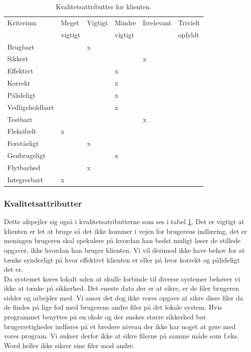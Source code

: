 \documentclass[10pt,a4paper,danish]{article}
\begin{document}
\begin{table}[h!]
  \begin{center}
    \begin{tabular}{llllll}
      \toprule
      Kriterium & Meget   & Vigtigt & Mindre  & Irrelevant & Trivielt \\
                & vigtigt &         & vigtigt &            & opfyldt  \\
      \midrule
      Brugbart        & &x& & & \\
      Sikkert         & & & &x& \\
      Effektivt       & & &x& & \\
      Korrekt         & & &x& & \\
      Pålideligt      & & &x& & \\
      Vedligeholdbart & & &x& & \\
      Testbart        & & & &x& \\
      Fleksibelt      &x& & & & \\
      Forståeligt     & &x& & & \\
      Genbrugeligt    & & &x& & \\
      Flytbarhed      & &x& & & \\
      Integrerbart    &x& & & & \\
      \bottomrule
    \end{tabular}
    \caption{Kvalitetsattributter for klienten.}
    \label{tab:kvalitetsattributter_program}
  \end{center}
\end{table}

\subsubsection{Kvalitetsattributter}
Dette afspejler sig også i kvalitetsatributterne som ses i tabel \ref{tab:kvalitetsattributter_program}.
Det er vigtigt at klienten er let at bruge så det ikke kommer i vejen for brugerens indlæring, det er meningen brugeren skal spekulere på hvordan han bedst muligt løser de stillede opgaver, ikke hvordan han bruger klienten.
Vi vil derimod ikke have behov for at tænke synderligt på hvor effektivt klienten er eller på hvor korrekt og pålideligt det er.
\\

Da systemet køres lokalt uden at skulle forbinde til diverse systemer behøver vi ikke at tænke på sikkerhed. Det eneste data der er at sikre, er de filer brugeren sidder og arbejder med. Vi anser det dog ikke vores opgave at sikre disse filer da de findes på lige fod med brugerens andre filer på det lokale system. Hvis programmet benyttes på en skole og der ønskes større sikkerhed bør brugerretigheder indføres på et bredere niveau der ikke har noget at gøre med vores program. Vi ønkser derfor ikke at sikre filerne på samme måde som f.eks. Word heller ikke sikrer sine filer mod andre.
\\
\end{document}
